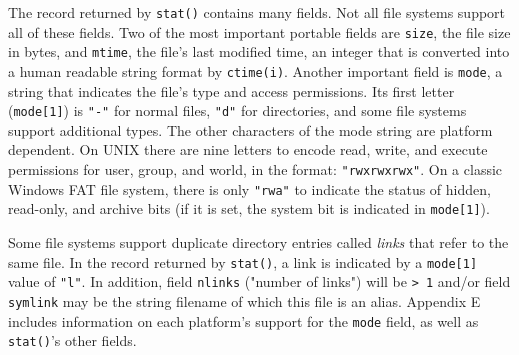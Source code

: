 
The record returned by \texttt{stat()} contains many fields. Not all file
systems support all of these fields. Two of the most important portable fields
are \texttt{size}, the file size in bytes, and \texttt{mtime},
the file's last modified time, an integer that is
converted into a human readable string format by \texttt{ctime(i)}. Another
important field is \texttt{mode}, a string that indicates the file's type and
access permissions. Its first letter (\texttt{mode[1]}) is
\texttt{"-"} for normal files, \texttt{"d"} for directories, and some file
systems support additional types. The other characters of the mode string are
platform dependent. On UNIX there are nine letters to encode read, write, and
execute permissions for user, group, and world, in the format:
\texttt{"rwxrwxrwx"}. On a classic Windows FAT file system, there is only
\texttt{"rwa"} to indicate the status of hidden, read-only, and archive bits (if
it is set, the system bit is indicated in \texttt{mode[1]}).

Some file systems support duplicate directory entries called
\textit{links} that refer to the same file. In the record returned by
\texttt{stat()}, a link is indicated by a
\texttt{mode[1]} value of \texttt{"l"}. In addition, field
\texttt{nlinks} ("number of links") will be \texttt{{\textgreater} 1}
and/or field \texttt{symlink} may be the string filename of which this
file is an alias. Appendix E includes information on each platform's
support for the \texttt{mode} field, as well as \texttt{stat()}'s
other fields.

